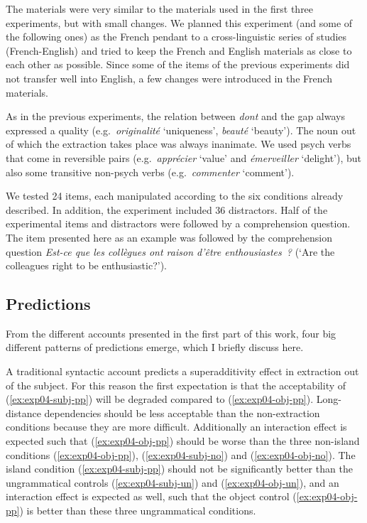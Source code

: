 The materials were very similar to the materials used in the first three experiments, but with small changes. We planned this experiment (and some of the following ones) as the French pendant to a cross-linguistic series of studies (French-English) and tried to keep the French and English materials as close to each other as possible. Since some of the items of the previous experiments did not transfer well into English, a few changes were introduced in the French materials.

As in the previous experiments, the relation between \emph{dont} and the gap always expressed a quality (e.g.\ \emph{originalité} `uniqueness', \emph{beauté} `beauty'). The noun out of which the extraction takes place was always inanimate. We used psych verbs that come in reversible pairs (e.g.\ \emph{apprécier} `value' and \emph{émerveiller} `delight'), but also some transitive non-psych verbs (e.g.\ \emph{commenter} `comment'). 

We tested 24 items, each manipulated according to the six conditions already described. In addition, the experiment included 36 distractors. Half of the experimental items and distractors were followed by a comprehension question. The item presented here as an example was followed by the comprehension question \emph{Est-ce que les collègues ont raison d'être enthousiastes~?} (`Are the colleagues right to be enthusiastic?'). 

\subsection{Predictions}

From the different accounts presented in the first part of this work, four big different patterns of predictions emerge, which I briefly discuss here.

A traditional syntactic account predicts a superadditivity effect in extraction out of the subject. For this reason the first expectation is that the acceptability of (\ref{ex:exp04-subj-pp}) will be degraded compared to (\ref{ex:exp04-obj-pp}). Long-distance dependencies should be less acceptable than the non-extraction conditions because they are more difficult. Additionally an interaction effect is expected such that (\ref{ex:exp04-obj-pp}) should be worse than the three non-island conditions (\ref{ex:exp04-obj-pp}), (\ref{ex:exp04-subj-no}) and (\ref{ex:exp04-obj-no}). The island condition (\ref{ex:exp04-subj-pp}) should not be significantly better than the ungrammatical controls (\ref{ex:exp04-subj-un}) and (\ref{ex:exp04-obj-un}), and an interaction effect is expected as well, such that the object control (\ref{ex:exp04-obj-pp}) is better than these three ungrammatical conditions. 


